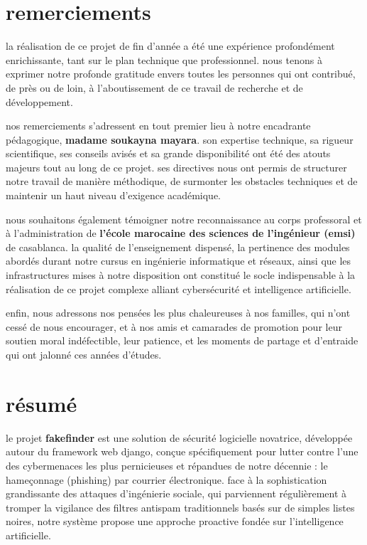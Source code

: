 \documentclass[12pt,a4paper]{report}
\begin{document}
\chapter*{remerciements}

la réalisation de ce projet de fin d'année a été une expérience profondément enrichissante, tant sur le plan technique que professionnel. nous tenons à exprimer notre profonde gratitude envers toutes les personnes qui ont contribué, de près ou de loin, à l'aboutissement de ce travail de recherche et de développement.

nos remerciements s'adressent en tout premier lieu à notre encadrante pédagogique, \textbf{madame soukayna mayara}. son expertise technique, sa rigueur scientifique, ses conseils avisés et sa grande disponibilité ont été des atouts majeurs tout au long de ce projet. ses directives nous ont permis de structurer notre travail de manière méthodique, de surmonter les obstacles techniques et de maintenir un haut niveau d'exigence académique.

nous souhaitons également témoigner notre reconnaissance au corps professoral et à l'administration de \textbf{l'école marocaine des sciences de l'ingénieur (emsi)} de casablanca. la qualité de l'enseignement dispensé, la pertinence des modules abordés durant notre cursus en ingénierie informatique et réseaux, ainsi que les infrastructures mises à notre disposition ont constitué le socle indispensable à la réalisation de ce projet complexe alliant cybersécurité et intelligence artificielle.

enfin, nous adressons nos pensées les plus chaleureuses à nos familles, qui n'ont cessé de nous encourager, et à nos amis et camarades de promotion pour leur soutien moral indéfectible, leur patience, et les moments de partage et d'entraide qui ont jalonné ces années d'études.

\chapter*{résumé}

le projet \textbf{fakefinder} est une solution de sécurité logicielle novatrice, développée autour du framework web django, conçue spécifiquement pour lutter contre l'une des cybermenaces les plus pernicieuses et répandues de notre décennie : le hameçonnage (phishing) par courrier électronique. face à la sophistication grandissante des attaques d'ingénierie sociale, qui parviennent régulièrement à tromper la vigilance des filtres antispam traditionnels basés sur de simples listes noires, notre système propose une approche proactive fondée sur l'intelligence artificielle.
\end{document}
